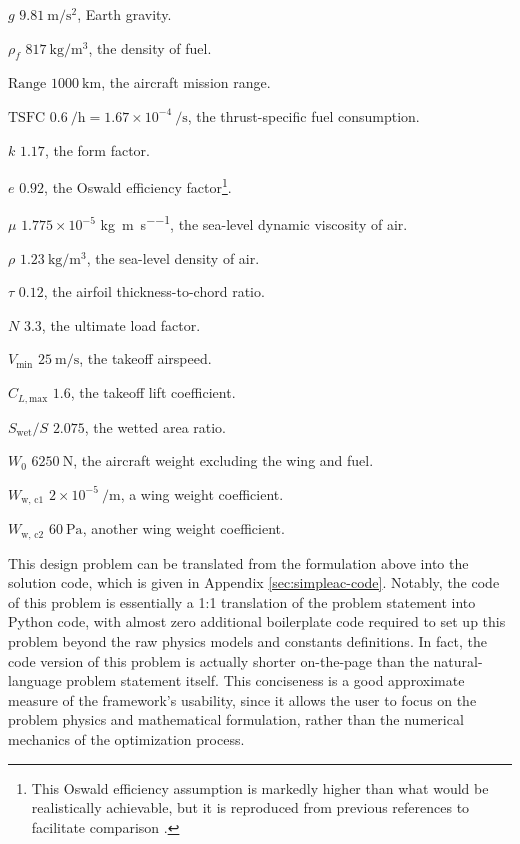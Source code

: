 \begin{example}
    \begin{eqexpl}
        \item {$g$} $9.81\ \si{\meter/\second\squared}$, Earth gravity.
        \item {$\rho_f$} $817\ \si{\kg/\meter\cubed}$, the density of fuel.
        \item {$\text{Range}$} $1000\ \si{\kilo\meter}$, the aircraft mission range.
        \item {$\text{TSFC}$} $0.6\ \si{\per\hour} = 1.67 \times 10^{-4}\ \si{\per\second}$, the thrust-specific fuel consumption.
        \item {$k$} $1.17$, the form factor.
        \item {$e$} $0.92$, the Oswald efficiency factor\footnote{This Oswald efficiency assumption is markedly higher than what would be realistically achievable, but it is reproduced from previous references to facilitate comparison \cite{hoburg, Ozturk2018, kirschen}.}.
        \item {$\mu$} $1.775 \times 10^{-5}$ \si{\kg\per\meter\per\second}, the sea-level dynamic viscosity of air.
        \item {$\rho$} $1.23\ \si{\kg/\meter\cubed}$, the sea-level density of air.
        \item {$\tau$} $0.12$, the airfoil thickness-to-chord ratio.
        \item {$N$} $3.3$, the ultimate load factor.
        \item {$V_\text{min}$} $25\ \si{\meter/\second}$, the takeoff airspeed.
        \item {$C_{L, \text{max}}$} $1.6$, the takeoff lift coefficient.
        \item {$S_\text{wet}/S$} $2.075$, the wetted area ratio.
        \item {$W_0$} $6250\ \si{\newton}$, the aircraft weight excluding the wing and fuel.
        \item {$W_\text{w, c1}$} $2 \times 10^{-5}\ \si{\per\meter}$, a wing weight coefficient.
        \item {$W_\text{w, c2}$} $60\ \si{\Pa}$, another wing weight coefficient.
    \end{eqexpl}

\end{example}

This design problem can be translated from the formulation above into the solution code, which is given in Appendix \ref{sec:simpleac-code}. Notably, the code of this problem is essentially a 1:1 translation of the problem statement into Python code, with almost zero additional boilerplate code required to set up this problem beyond the raw physics models and constants definitions. In fact, the code version of this problem is actually shorter on-the-page than the natural-language problem statement itself. This conciseness is a good approximate measure of the framework's usability, since it allows the user to focus on the problem physics and mathematical formulation, rather than the numerical mechanics of the optimization process.

